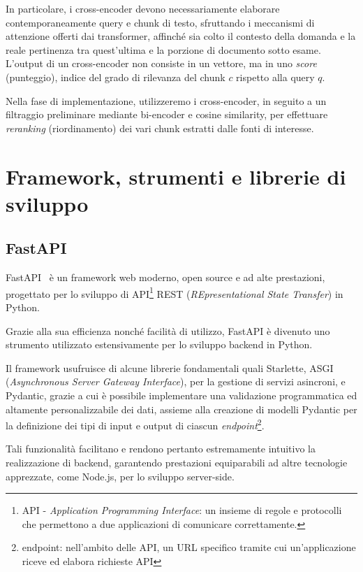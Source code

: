 In particolare, i cross-encoder devono necessariamente elaborare contemporaneamente query e chunk di testo, sfruttando i meccanismi di attenzione offerti dai transformer, affinché sia colto il contesto della domanda e la reale pertinenza tra quest'ultima e la porzione di documento sotto esame. L'output di un cross-encoder non consiste in un vettore, ma in uno \textit{score} (punteggio), indice del grado di rilevanza del chunk $c$ rispetto alla query $q$.

Nella fase di implementazione, utilizzeremo i cross-encoder, in seguito a un filtraggio preliminare mediante bi-encoder e cosine similarity, per effettuare \textit{reranking} (riordinamento) dei vari chunk estratti dalle fonti di interesse.

\section{Framework, strumenti e librerie di sviluppo}

\subsection{FastAPI}
FastAPI~\cite{fastapi_docs} è un framework web moderno, open source e ad alte prestazioni, progettato per lo sviluppo di API\footnote{API - \textit{Application Programming Interface}: un insieme di regole e protocolli che permettono a due applicazioni di comunicare correttamente.} REST (\textit{REpresentational State Transfer}) in Python.

Grazie alla sua efficienza nonché facilità di utilizzo, FastAPI è divenuto uno strumento utilizzato estensivamente per lo sviluppo backend in Python.

Il framework usufruisce di alcune librerie fondamentali quali Starlette, ASGI (\textit{Asynchronous Server Gateway Interface}), per la gestione di servizi asincroni, e Pydantic, grazie a cui è possibile implementare una validazione programmatica ed altamente personalizzabile dei dati, assieme alla creazione di modelli Pydantic per la definizione dei tipi di input e output di ciascun \textit{endpoint}\footnote{endpoint: nell'ambito delle API, un URL specifico tramite cui un'applicazione riceve ed elabora richieste API}.

Tali funzionalità facilitano e rendono pertanto estremamente intuitivo la realizzazione di backend, garantendo prestazioni equiparabili ad altre tecnologie apprezzate, come Node.js, per lo sviluppo server-side.

